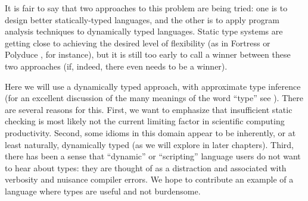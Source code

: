 It is fair to say that two approaches to this problem are being tried: one is
to design better statically-typed languages, and the other is to apply
program analysis techniques to dynamically typed languages.
Static type systems are getting close to achieving the desired level
of flexibility (as in Fortress \cite{fortresspec} or Polyduce \cite{polyduce1},
for instance), but it is still too early to call a winner between these two
approaches (if, indeed, there even needs to be a winner).

Here we will use a dynamically typed approach, with approximate
type inference
(for an excellent discussion of the many meanings of the word ``type''
see \cite{Kell2014}).
There are several reasons for this.
First, we want to emphasize that insufficient static
checking is most likely not the current limiting factor in scientific
computing productivity. Second, some idioms in this domain appear to be
inherently, or at least naturally, dynamically typed (as we will explore in
later  chapters).  Third, there has been a sense that ``dynamic'' or
``scripting'' language users do not want to hear about types: they are 
thought of as a distraction and 
associated with verbosity and nuisance compiler errors. We hope to
contribute an example of a language where types are useful and not
burdensome.




